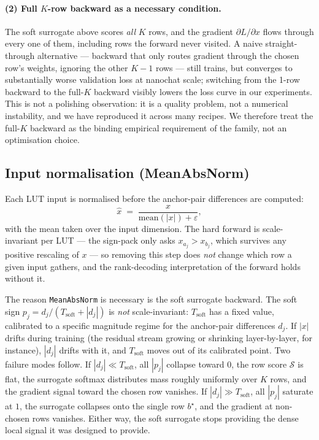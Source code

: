 \documentclass[11pt]{article}
\newcommand{\Tsoft}{T_{\mathrm{soft}}}
\newcommand{\bstar}{b^{\star}}
\begin{document}
\paragraph{(2) Full $K$-row backward as a necessary condition.} The soft surrogate above scores \emph{all} $K$ rows, and the gradient $\partial L / \partial x$ flows through every one of them, including rows the forward never visited. A naive straight-through alternative --- backward that only routes gradient through the chosen row's weights, ignoring the other $K{-}1$ rows --- still trains, but converges to substantially worse validation loss at nanochat scale; switching from the 1-row backward to the full-$K$ backward visibly lowers the loss curve in our experiments. This is not a polishing observation: it is a quality problem, not a numerical instability, and we have reproduced it across many recipes. We therefore treat the full-$K$ backward as the binding empirical requirement of the family, not an optimisation choice.

\subsection{Input normalisation (MeanAbsNorm)}

Each LUT input is normalised before the anchor-pair differences are computed:
\[
\hat x \;=\; \frac{x}{\mathrm{mean}(|x|) + \varepsilon},
\]
with the mean taken over the input dimension. The hard forward is scale-invariant per LUT --- the sign-pack only asks $x_{a_j} > x_{b_j}$, which survives any positive rescaling of $x$ --- so removing this step does \emph{not} change which row a given input gathers, and the rank-decoding interpretation of the forward holds without it.

The reason \texttt{MeanAbsNorm} is necessary is the soft surrogate backward. The soft sign $p_j = d_j / (\Tsoft + |d_j|)$ is \emph{not} scale-invariant: $\Tsoft$ has a fixed value, calibrated to a specific magnitude regime for the anchor-pair differences $d_j$. If $|x|$ drifts during training (the residual stream growing or shrinking layer-by-layer, for instance), $|d_j|$ drifts with it, and $\Tsoft$ moves out of its calibrated point. Two failure modes follow. If $|d_j| \ll \Tsoft$, all $|p_j|$ collapse toward $0$, the row score $\mathcal{S}$ is flat, the surrogate softmax distributes mass roughly uniformly over $K$ rows, and the gradient signal toward the chosen row vanishes. If $|d_j| \gg \Tsoft$, all $|p_j|$ saturate at $1$, the surrogate collapses onto the single row $\bstar$, and the gradient at non-chosen rows vanishes. Either way, the soft surrogate stops providing the dense local signal it was designed to provide.
\end{document}
